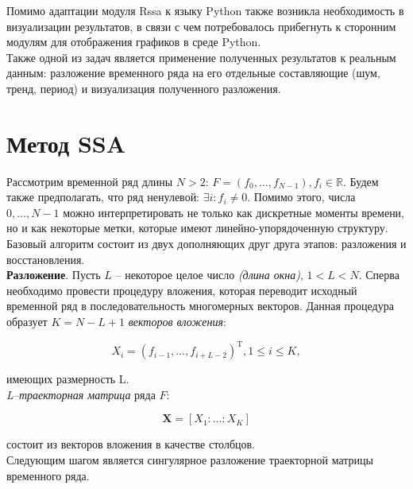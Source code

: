 \documentclass[specialist,
			   substylefile = spbu_report.rtx,
			   subf,href,colorlinks=true, 12pt]{disser}
\begin{document}
Помимо адаптации модуля Rssa к языку Python также возникла необходимость в визуализации результатов, в связи с чем потребовалось прибегнуть к сторонним модулям для отображения графиков в среде Python.\\

Также одной из задач является применение полученных результатов к реальным данным: разложение временного ряда на его отдельные составляющие (шум, тренд, период) и визуализация полученного разложения.\\

\chapter{Метод SSA}

Рассмотрим временной ряд длины $N > 2$: $F = (f_0, \dots, f_{N - 1}), f_i \in \mathbb{R}$. Будем также предполагать, что ряд ненулевой: $\exists  i: f_i \neq 0$. Помимо этого, числа $0, \dots, N - 1$ можно интерпретировать не только как дискретные моменты времени, но и как некоторые метки, которые имеют линейно-упорядоченную структуру.\\

Базовый алгоритм состоит из двух дополняющих друг друга этапов: разложения и восстановления.\\

\textbf{Разложение}. Пусть $L$ – некоторое целое число \textit{(длина окна)}, $1 < L < N$. Сперва необходимо провести процедуру вложения, которая переводит исходный временной ряд в последовательность многомерных векторов. Данная процедура образует $K = N - L + 1$ \textit{векторов вложения}:

\begin{equation*}
	X_i = (f_{i - 1}, \dots, f_{i + L - 2})^\mathrm{T}, 1 \leq i \leq K,
\end{equation*}

имеющих размерность L. \\

\textit{L–траекторная матрица} ряда $F$:

\begin{equation*}
	\mathbf{X} = [X_1: \dots: X_K]
\end{equation*}

состоит из векторов вложения в качестве столбцов.\\

Следующим шагом является сингулярное разложение траекторной матрицы временного ряда.\\
\end{document}
